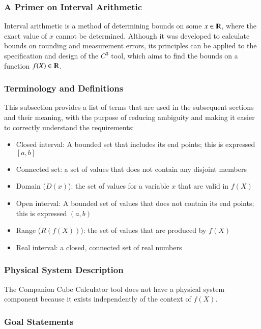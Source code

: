 \documentclass[12pt]{article}
\newcommand{\progname}{Companion Cube Calculator} %
\newcommand{\prognameAbbrv}{$C^{3}$}
\begin{document}
\subsubsection{A Primer on Interval Arithmetic}
Interval arithmetic is a method of determining bounds on some $x \in 
\varmathbb{R}$, where the exact value of $x$ cannot be determined. Although it 
was developed to calculate bounds on rounding and measurement errors, its 
principles can be applied to the specification and design of the 
\prognameAbbrv{} tool, which aims to find the bounds on a function $f(X) \in 
\varmathbb{R}$.

\subsubsection{Terminology and  Definitions}

This subsection provides a list of terms that are used in the subsequent
sections and their meaning, with the purpose of reducing ambiguity and making it
easier to correctly understand the requirements:

\begin{itemize}

\item Closed interval: A bounded set that includes its end points; this is 
expressed $[a,b]$
\item Connected set: a set of values that does not contain any disjoint members
\item Domain ($D(x)$): the set of values for a variable $x$ that are valid in 
$f(X)$
\item Open interval: A bounded set of values that does not contain its end 
points; this is expressed $(a,b)$
\item Range ($R(f(X))$): the set of values that are produced by $f(X)$
\item Real interval: a closed, connected set of real numbers

\end{itemize}

\subsubsection{Physical System Description}

The \progname{} tool does not have a physical system component because it 
exists independently of the context of $f(X)$. 

\subsubsection{Goal Statements}
\end{document}
